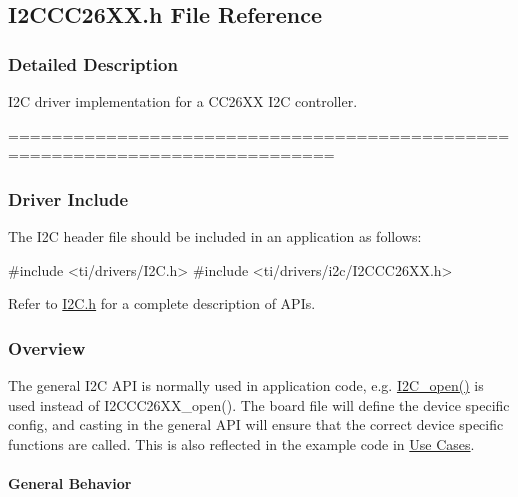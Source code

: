 \subsection{I2\+C\+C\+C26\+X\+X.\+h File Reference}
\label{_i2_c_c_c26_x_x_8h}


\subsubsection{Detailed Description}
I2\+C driver implementation for a C\+C26\+X\+X I2\+C controller. 

============================================================================

\subsubsection*{Driver Include}

The I2\+C header file should be included in an application as follows\+: 
\begin{DoxyCode}
\textcolor{preprocessor}{#include <ti/drivers/I2C.h>}
\textcolor{preprocessor}{#include <ti/drivers/i2c/I2CCC26XX.h>}
\end{DoxyCode}


Refer to \hyperlink{_i2_c_8h}{I2\+C.\+h} for a complete description of A\+P\+Is.

\subsubsection*{Overview}

The general I2\+C A\+P\+I is normally used in application code, e.\+g. \hyperlink{_i2_c_8h_ae1aa99e1fee4517406018e10025cca0e}{I2\+C\+\_\+open()} is used instead of I2\+C\+C\+C26\+X\+X\+\_\+open(). The board file will define the device specific config, and casting in the general A\+P\+I will ensure that the correct device specific functions are called. This is also reflected in the example code in \hyperlink{_i2_c_c_c26_x_x_8h_I2C_USE_CASES}{Use Cases}.

\paragraph*{General Behavior}

